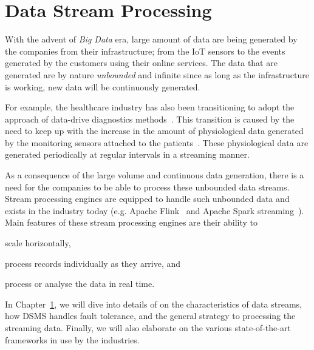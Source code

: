 \chapter{Data Stream Processing}
\label{chap:data_stream_processing}

With the advent of \emph{Big Data} era, large amount of data are being generated 
by the companies from their infrastructure; from the IoT sensors to the events 
generated by the customers using their online services. The data that 
are generated are by nature \emph{unbounded} and infinite since as long 
as the infrastructure is working, new data will be continuously generated. 

For example, the healthcare industry has also been transitioning to 
adopt the approach of data-drive diagnostics methods~\cite{hospital_diagnosis}. 
This transition is caused by the need to keep up with the increase in the amount 
of physiological data generated by the monitoring sensors attached to the 
patients~\cite{hospital_data_monitoring}. These physiological data are generated 
periodically at regular intervals in a streaming manner. 

As a consequence of the large volume and continuous data generation, there is a need for 
the companies to be able to process these unbounded data streams.
Stream processing engines are equipped to handle such unbounded data and exists in 
the industry today (e.g. Apache Flink~\cite{flink} and 
Apache Spark streaming~\cite{spark_streaming}). Main features of these stream 
processing engines are their ability to 
\renewcommand{\labelenumi}{(\roman{enumi})}
\begin{enumerate*}
    \item scale horizontally, 
    \item process records individually as they arrive, and
    \item process or analyse the data in real time.
\end{enumerate*}

In Chapter~\ref{chap:data_stream_processing}, we will dive into details of 
on the characteristics of data streams, how DSMS handles fault tolerance, and
the general strategy to processing the streaming data. Finally, we will also elaborate on the 
various state-of-the-art frameworks in use by the industries.

